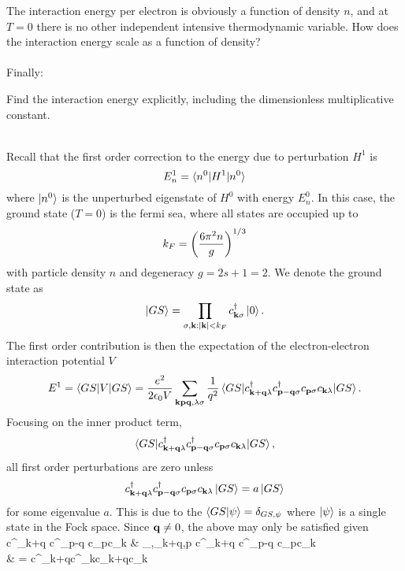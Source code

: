 \documentclass[10pt,letterpaper]{article}
\begin{document}
	\item
	The interaction energy per electron is obviously a function of density $n$, and at $T=0$ there is no other independent
	intensive thermodynamic variable. How does the interaction energy scale as a function of density?
	\\ \\ Finally:\\ 
	
	\item
	Find the interaction energy explicitly, including the dimensionless multiplicative constant. \\ \\
	\eenum 
	\benum
	\item
	Recall that the first order correction to the energy due to perturbation $H^1$ is
	\[
		E^1_n=\braket{n^0|H^1|n^0}
	\]
	where $\ket{n^0}$ is the unperturbed eigenstate of $H^0$ with energy $E^0_n$. In this case,
	the ground state ($T=0$) is the fermi sea, where all states are occupied up to 
	\[
		k_F = \left(\frac{6\pi^2 n}{g}\right)^{1/3}
	\]
	with particle density $n$ and degeneracy $g = 2s+1 =2$. We denote the ground state as 
	\[
		\ket{GS} = \prod_{\sigma, \mathbf{k}:|\mathbf{k}| < k_F} c^\dag_{\mathbf{k}\sigma}\ket 0.
	\]
	The first order contribution is then the expectation of the electron-electron interaction potential $V$
	\[
		E^1 = \braket{GS|V|GS} = 
		\frac{e^2}{2\epsilon_0 V}\sum_{\mathbf{k}\mathbf{p}\mathbf{q},\lambda \sigma}
		\frac{1}{q^2}
		\braket{GS|
		c^\dag_{\mathbf{k}+\mathbf{q} \lambda}c^\dag_{\mathbf{p}-\mathbf{q} \sigma}c_{\mathbf{p}\sigma}c_{\mathbf{k}\lambda}
		|GS}.
	\]
	Focusing on the inner product term,
	\[
		\braket{GS|
		c^\dag_{\mathbf{k}+\mathbf{q} \lambda}c^\dag_{\mathbf{p}-\mathbf{q} \sigma}c_{\mathbf{p}\sigma}c_{\mathbf{k}\lambda}
		|GS},
	\]
	 all first order perturbations are zero unless
	\[
		c^\dag_{\mathbf{k}+\mathbf{q} \lambda}c^\dag_{\mathbf{p}-\mathbf{q} \sigma}c_{\mathbf{p}\sigma}c_{\mathbf{k}\lambda}
		\ket{GS} = a\ket{GS}
	\]
	for some eigenvalue $a$. This is due to the $\braket{GS|\psi} = \delta_{GS,\psi}$ where $\ket\psi$ is a single state in the 		Fock space. Since
	$\mathbf{q}\ne 0$, the above may only be satisfied given 
	\ba
		c^\dag_{\vect k+\vect q \lambda}c^\dag_{\vect p-\vect q \sigma}c_{\vect p\sigma}c_{\vect k\lambda}
		& \to \delta_{\lambda,\sigma}\delta_{\vect k+\vect q,\vect p}
		c^\dag_{\vect k+\vect q \lambda}c^\dag_{\vect p-\vect q \sigma}c_{\vect p\sigma}c_{\vect k\lambda}
		\\
		& = c^\dag_{\vect k+\vect q\sigma}c^\dag_{\vect k\sigma}c_{\vect k+\vect q\sigma}c_{\vect k\sigma}
\end{document}
